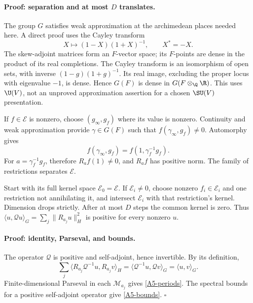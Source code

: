 \paragraph{Proof: separation and at most $D$ translates.}
The group $G$ satisfies weak approximation at the archimedean places
needed here. A direct proof uses the Cayley transform
\[
 X\longmapsto(1-X)(1+X)^{-1},\qquad X^*=-X.
\]
The skew-adjoint matrices form an $F$-vector space; its $F$-points
are dense in the product of its real completions. The Cayley transform
is an isomorphism of open sets, with inverse
$(1-g)(1+g)^{-1}$. Its real image, excluding the proper locus with
eigenvalue $-1$, is dense. Hence $G(F)$ is dense in
$G(F\otimes_\Q\R)$. This uses $\U(V)$, not an unproved
approximation assertion for a chosen $\SU(V)$ presentation.

If $f\in\mathcal E$ is nonzero, choose $(g_\infty,g_f)$ where its
value is nonzero. Continuity and weak approximation provide
$\gamma\in G(F)$ such that $f(\gamma_\infty,g_f)\ne0$.
Automorphy gives
\[
 f(\gamma_\infty,g_f)=f(1,\gamma_f^{-1}g_f).
\]
For $a=\gamma_f^{-1}g_f$, therefore $R_af(1)\ne0$, and
$R_af$ has positive norm. The family of restrictions separates
$\mathcal E$.

Start with its full kernel space $\mathcal E_0=\mathcal E$.
If $\mathcal E_i\ne0$, choose nonzero $f_i\in\mathcal E_i$ and
one restriction not annihilating it, and intersect $\mathcal E_i$
with that restriction's kernel. Dimension drops strictly. After at
most $D$ steps the common kernel is zero. Thus
$\langle u,\mathcal Q u\rangle_G=\sum_j\|R_{a_j}u\|_H^2$
is positive for every nonzero $u$.

\paragraph{Proof: identity, Parseval, and bounds.}
The operator $\mathcal Q$ is positive and self-adjoint, hence
invertible. By its definition,
\[
 \sum_j\langle R_{a_j}\mathcal Q^{-1}u,R_{a_j}v\rangle_H
 =\langle\mathcal Q^{-1}u,\mathcal Q v\rangle_G
 =\langle u,v\rangle_G.
\]
Finite-dimensional Parseval in each $\mathcal M_{a_j}$ gives
\eqref{A5-periods}. The spectral bounds for a positive self-adjoint
operator give \eqref{A5-bounds}. $\square$

